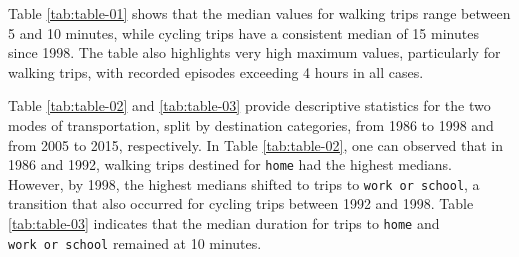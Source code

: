 \documentclass[Royal,times,sageh]{sagej}
\begin{document}
Table \ref{tab:table-01} shows that the median values for walking trips
range between 5 and 10 minutes, while cycling trips have a consistent
median of 15 minutes since 1998. The table also highlights very high
maximum values, particularly for walking trips, with recorded episodes
exceeding 4 hours in all cases.

Table \ref{tab:table-02} and \ref{tab:table-03} provide descriptive
statistics for the two modes of transportation, split by destination
categories, from 1986 to 1998 and from 2005 to 2015, respectively. In
Table \ref{tab:table-02}, one can observed that in 1986 and 1992,
walking trips destined for \texttt{home} had the highest medians.
However, by 1998, the highest medians shifted to trips to
\texttt{work\ or\ school}, a transition that also occurred for cycling
trips between 1992 and 1998. Table \ref{tab:table-03} indicates that the
median duration for trips to \texttt{home} and \texttt{work\ or\ school}
remained at 10 minutes.

\begingroup\fontsize{6}{8}\selectfont
\end{document}
